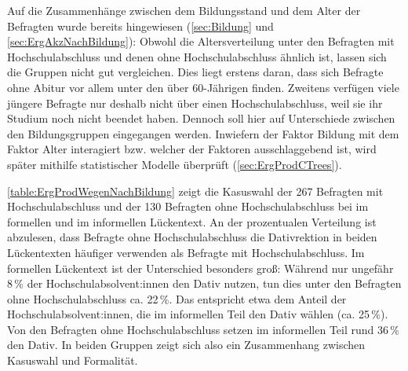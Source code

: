 Auf die Zusammenhänge zwischen dem Bildungsstand und dem Alter der Befragten wurde bereits hingewiesen (\autoref{sec:Bildung} und \autoref{sec:ErgAkzNachBildung}): 
Obwohl die Altersverteilung unter den Befragten mit Hochschulabschluss und denen ohne Hochschulabschluss ähnlich ist, lassen sich die Gruppen nicht gut vergleichen. 
Dies liegt erstens daran, dass sich Befragte ohne Abitur vor allem unter den über 60-Jährigen finden. 
Zweitens verfügen viele jüngere Befragte nur deshalb nicht über einen Hochschulabschluss, weil sie ihr Studium noch nicht beendet haben. 
Dennoch soll hier auf Unterschiede zwischen den Bildungsgruppen eingegangen werden. 
Inwiefern der Faktor \glqq Bildung\grqq{} mit dem Faktor \glqq Alter\grqq{} interagiert bzw. welcher der Faktoren ausschlaggebend ist, wird später mithilfe statistischer Modelle überprüft (\autoref{sec:ErgProdCTrees}). 

\autoref{table:ErgProdWegenNachBildung} zeigt die Kasuswahl der 267 Befragten mit Hochschulabschluss und der 130 Befragten ohne Hochschulabschluss bei \wegen{} im formellen und im informellen Lückentext. 
An der prozentualen Verteilung ist abzulesen, dass Befragte ohne Hochschulabschluss die Dativrektion in beiden Lückentexten häufiger verwenden als Befragte mit Hochschulabschluss. 
Im formellen Lückentext ist der Unterschied besonders groß: 
Während nur ungefähr 8\,\% der Hochschulabsolvent:innen den Dativ nutzen, tun dies unter den Befragten ohne Hochschulabschluss ca. 22\,\%. 
Das entspricht etwa dem Anteil der Hochschulabsolvent:innen, die im informellen Teil den Dativ wählen (ca. 25\,\%). 
Von den Befragten ohne Hochschulabschluss setzen im informellen Teil rund 36\,\% den Dativ. 
In beiden Gruppen zeigt sich also ein Zusammenhang zwischen Kasuswahl und Formalität. 

